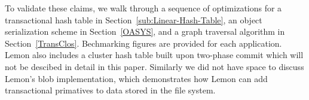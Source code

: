 \documentclass[letterpaper,twocolumn,english]{article}
\newcommand{\yad}{Lemon\xspace}
\begin{document}
To validate these claims, we walk
through a sequence of optimizations for a transactional hash
table in Section~\ref{sub:Linear-Hash-Table}, an object serialization 
scheme in Section~\ref{OASYS}, and a graph traversal algorithm in 
Section~\ref{TransClos}.  Bechmarking figures are provided for each 
application.  \yad also includes a cluster hash table 
built upon two-phase commit which will not be descibed in detail 
in this paper.  Similarly we did not have space to discuss \yad's 
blob implementation, which demonstrates how \yad can
add transactional primatives to data stored in the file system.



\end{document}
